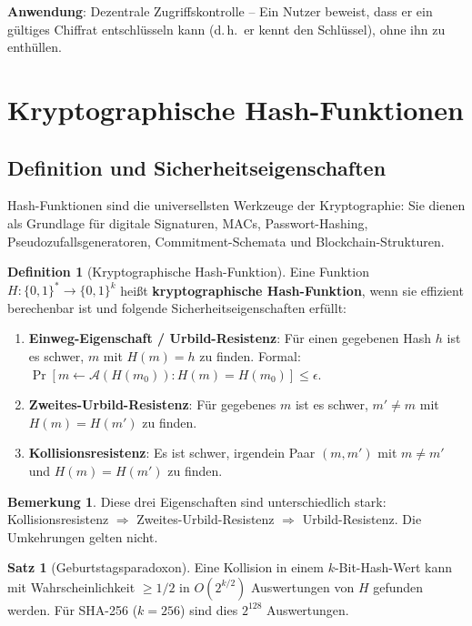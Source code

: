 ﻿\documentclass[a4paper,12pt]{scrreprt}
\theoremstyle{definition}
\newtheorem{definition}{Definition}[section]
\newtheorem{bemerkung}{Bemerkung}[section]
\newtheorem{satz}{Satz}[section]
\begin{document}
\textbf{Anwendung}: Dezentrale Zugriffskontrolle -- Ein Nutzer beweist, dass er ein gültiges Chiffrat entschlüsseln kann (d.\,h.\ er kennt den Schlüssel), ohne ihn zu enthüllen.

\section{Kryptographische Hash-Funktionen}

\subsection{Definition und Sicherheitseigenschaften}

Hash-Funktionen sind die universellsten Werkzeuge der Kryptographie: Sie dienen als Grundlage für digitale Signaturen, MACs, Passwort-Hashing, Pseudozufallsgeneratoren, Commitment-Schemata und Blockchain-Strukturen.

\begin{definition}[Kryptographische Hash-Funktion]
Eine Funktion $H: \{0,1\}^* \to \{0,1\}^k$ heißt \textbf{kryptographische Hash-Funktion}, wenn sie effizient berechenbar ist und folgende Sicherheitseigenschaften erfüllt:
\begin{enumerate}
    \item \textbf{Einweg-Eigenschaft / Urbild-Resistenz}: Für einen gegebenen Hash $h$ ist es schwer, $m$ mit $H(m) = h$ zu finden. Formal: $\Pr[m \leftarrow \mathcal{A}(H(m_0)) : H(m) = H(m_0)] \leq \epsilon$.
    \item \textbf{Zweites-Urbild-Resistenz}: Für gegebenes $m$ ist es schwer, $m' \neq m$ mit $H(m) = H(m')$ zu finden.
    \item \textbf{Kollisionsresistenz}: Es ist schwer, irgendein Paar $(m, m')$ mit $m \neq m'$ und $H(m) = H(m')$ zu finden.
\end{enumerate}
\end{definition}

\begin{bemerkung}
Diese drei Eigenschaften sind unterschiedlich stark: Kollisionsresistenz $\Rightarrow$ Zweites-Urbild-Resistenz $\Rightarrow$ Urbild-Resistenz. Die Umkehrungen gelten nicht.
\end{bemerkung}

\begin{satz}[Geburtstagsparadoxon]
Eine Kollision in einem $k$-Bit-Hash-Wert kann mit Wahrscheinlichkeit $\geq 1/2$ in $O(2^{k/2})$ Auswertungen von $H$ gefunden werden. Für SHA-256 ($k=256$) sind dies $2^{128}$ Auswertungen.
\end{satz}
\end{document}
